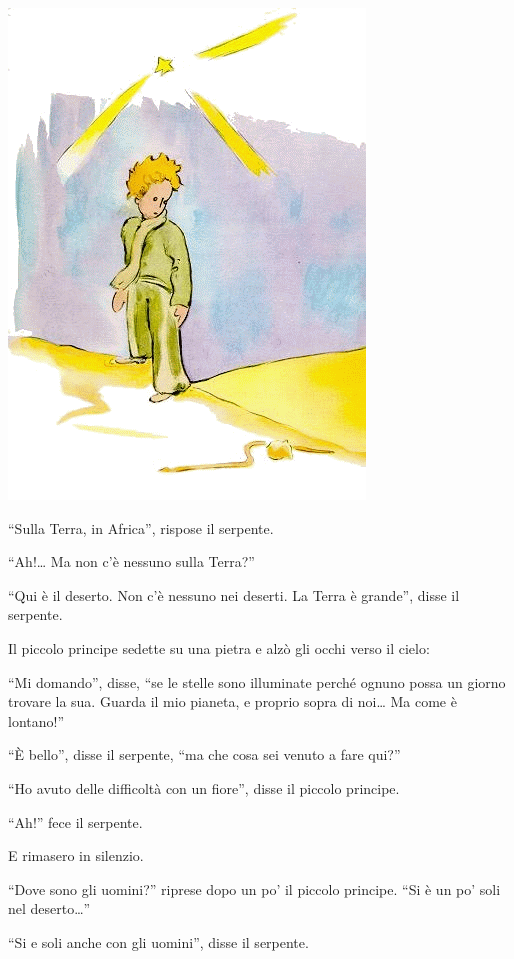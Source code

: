 \documentclass[11pt]{scrbook}
\begin{document}
\begin{center}
\includegraphics{img/17a}
\end{center}

``Sulla Terra, in Africa'', rispose il serpente.

``Ah!\ldots{} Ma non c'è nessuno sulla Terra?''

``Qui è il deserto. Non c'è nessuno nei deserti. La Terra è grande'', disse il serpente.

Il piccolo principe sedette su una pietra e alzò gli occhi verso il cielo:

``Mi domando'', disse, ``se le stelle sono illuminate perché ognuno possa un giorno trovare la sua. Guarda il mio pianeta, e proprio sopra di noi\ldots{} Ma come è lontano!''

``È bello'', disse il serpente, ``ma che cosa sei venuto a fare qui?''

``Ho avuto delle difficoltà con un fiore'', disse il piccolo principe.

``Ah!'' fece il serpente.

E rimasero in silenzio.

``Dove sono gli uomini?'' riprese dopo un po' il piccolo principe. ``Si è un po' soli nel deserto\ldots{}''

``Si e soli anche con gli uomini'', disse il serpente.
\end{document}
